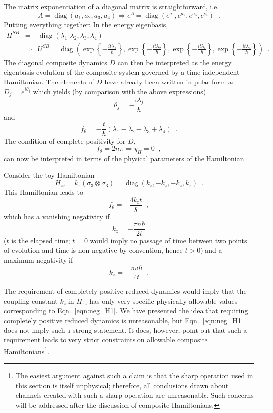 The matrix exponentiation of a diagonal matrix is straightforward, i.e.\
$$
A=\operatorname{diag}(a_1,a_2,a_3,a_4)\Rightarrow e^A=\operatorname{diag}(e^{a_1},e^{a_2},e^{a_3},e^{a_4})\;\;.
$$
Putting everything together:  In the energy eigenbasis,
\begin{eqnarray*}
H^{SB}&=&\operatorname{diag}(\lambda_1,\lambda_2,\lambda_3,\lambda_4)\\
&\Rightarrow& U^{SB}=\operatorname{diag}\left(\exp{\left\{-\frac{it\lambda_1}{\hbar}\right\}},\exp{\left\{-\frac{it\lambda_2}{\hbar}\right\}},\exp{\left\{-\frac{it\lambda_3}{\hbar}\right\}},\exp{\left\{-\frac{it\lambda_4}{\hbar}\right\}}\right)\;\;.
\end{eqnarray*}
The diagonal composite dynamics $D$ can then be interpreted as the energy eigenbasis evolution of the composite system governed by a time independent Hamiltonian.  The elements of $D$ have already been written in polar form as $D_j=e^{i\theta_j}$ which yields (by comparison with the above expressions)
$$
\theta_j = -\frac{t\lambda_j}{\hbar}
$$
and
\begin{equation}
\label{eqn:ftheta}
f_\theta = -\frac{t}{\hbar}\left(\lambda_1-\lambda_2-\lambda_3+\lambda_4\right)\;\;.
\end{equation}
The condition of complete positivity for $D$,
$$
f_\theta = 2n\pi \Rightarrow \eta_H = 0\;\;,
$$
can now be interpreted in terms of the physical parameters of the Hamiltonian.

Consider the toy Hamiltonian
$$
H_{zz} = k_z \left(\sigma_3\otimes\sigma_3\right) = \operatorname{diag}(k_z,-k_z,-k_z,k_z)\;\;.
$$
This Hamiltonian leads to
$$
f_\theta = -\frac{4k_zt}{\hbar}\;\;,
$$
which has a vanishing negativity if
\begin{equation}
\label{eqn:neg_H1}
k_z = -\frac{\pi n \hbar}{2t}
\end{equation}
($t$ is the elapsed time; $t=0$ would imply no passage of time between two points of evolution and time is non-negative by convention, hence $t>0$) and a maximum negativity if
$$
k_z = -\frac{\pi n \hbar}{4t}\;\;.
$$

The requirement of completely positive reduced dynamics would imply that the coupling constant $k_z$ in $H_{zz}$ has only very specific physically allowable values corresponding to Eqn.\ \ref{eqn:neg_H1}.  We have presented the idea that requiring completely positive reduced dynamics is unreasonable, but Eqn.\ \ref{eqn:neg_H1} does not imply such a strong statement.  It does, however, point out that such a requirement leads to very strict constraints on allowable composite Hamiltonians\footnote{The easiest argument against such a claim is that the sharp operation used in this section is itself unphysical; therefore, all conclusions drawn about channels created with such a sharp operation are unreasonable.  Such concerns will be addressed after the discussion of composite Hamiltonians.}.  

